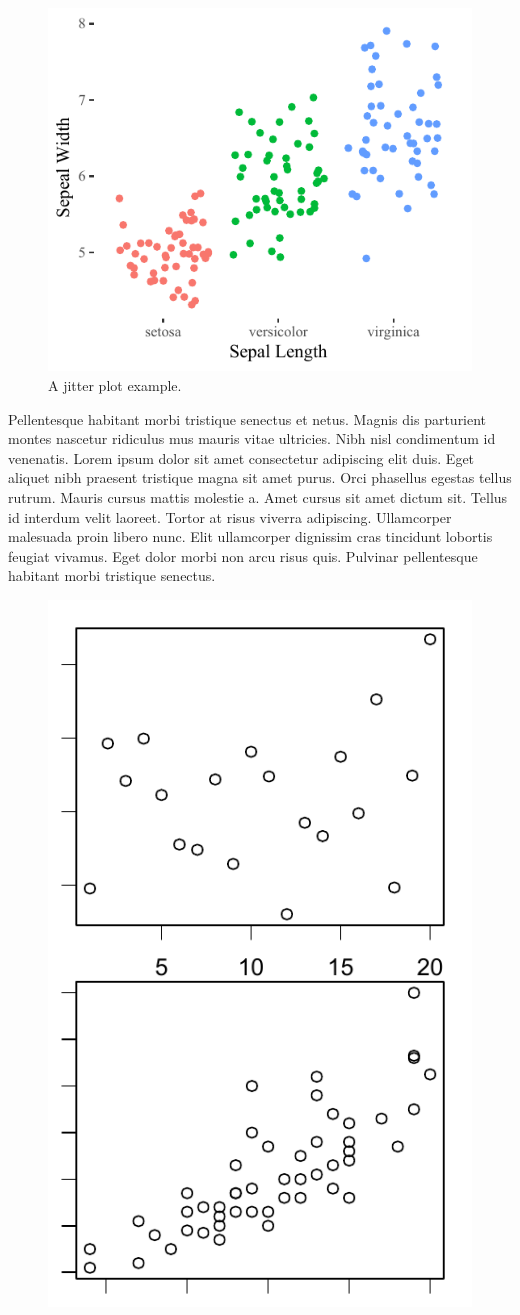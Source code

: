 \documentclass[article,30pt,extrafontsizes]{memoir}
\begin{document}
\begin{adjmulticols*}{3}{10mm}{10mm}
{\begin{figure}

{\centering \includegraphics[width=0.5\linewidth]{skeleton_files/figure-latex/unnamed-chunk-6-1} 

}

\caption{A jitter plot example.}\label{fig:unnamed-chunk-6}
\end{figure}

Pellentesque habitant morbi tristique senectus et netus. Magnis dis
parturient montes nascetur ridiculus mus mauris vitae ultricies. Nibh
nisl condimentum id venenatis. Lorem ipsum dolor sit amet consectetur
adipiscing elit duis. Eget aliquet nibh praesent tristique magna sit
amet purus. Orci phasellus egestas tellus rutrum. Mauris cursus mattis
molestie a. Amet cursus sit amet dictum sit. Tellus id interdum velit
laoreet. Tortor at risus viverra adipiscing. Ullamcorper malesuada proin
libero nunc. Elit ullamcorper dignissim cras tincidunt lobortis feugiat
vivamus. Eget dolor morbi non arcu risus quis. Pulvinar pellentesque
habitant morbi tristique senectus.

\begin{figure}

{\centering \includegraphics[width=0.65\linewidth]{skeleton_files/figure-latex/unnamed-chunk-7-1} 

}
\end{figure}}
\end{adjmulticols*}
\end{document}
